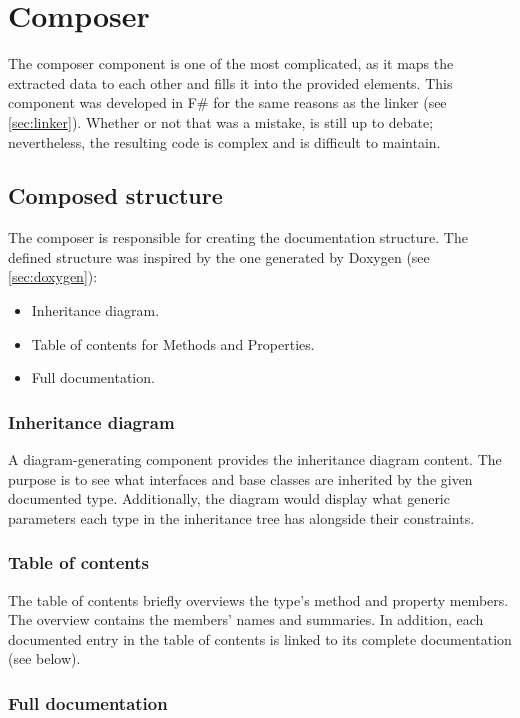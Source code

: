 \section{Composer}

The composer component is one of the most complicated, as it maps the extracted data to each other and fills it into the provided elements. This component was developed in F\# for the same reasons as the linker (see \ref{sec:linker}). Whether or not that was a mistake, is still up to debate; nevertheless, the resulting code is complex and is difficult to maintain.

\subsection{Composed structure}

The composer is responsible for creating the documentation structure. The defined structure was inspired by the one generated by Doxygen (see \ref{sec:doxygen}):
\begin{itemize}
    \item Inheritance diagram.
    \item Table of contents for Methods and Properties.
    \item Full documentation.
\end{itemize}

\subsubsection{Inheritance diagram}

A diagram-generating component provides the inheritance diagram content. The purpose is to see what interfaces and base classes are inherited by the given documented type. Additionally, the diagram would display what generic parameters each type in the inheritance tree has alongside their constraints.

\subsubsection{Table of contents}

The table of contents briefly overviews the type's method and property members. The overview contains the members' names and summaries. In addition, each documented entry in the table of contents is linked to its complete documentation (see below).

\subsubsection{Full documentation}

